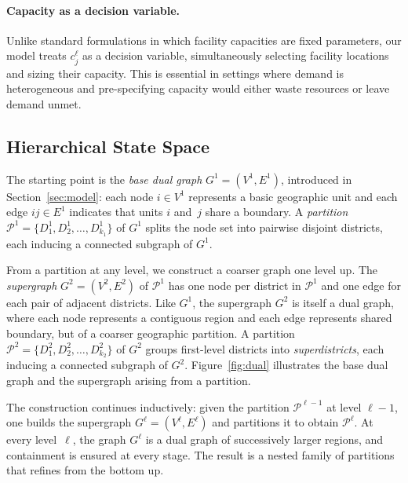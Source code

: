 \documentclass[11pt]{article}
\theoremstyle{definition}
\begin{document}
\paragraph{Capacity as a decision variable.}
Unlike standard formulations in which facility capacities are fixed parameters,
our model treats $c^{\ell}_j$ as a decision variable, simultaneously selecting
facility locations and sizing their capacity.  This is essential in settings
where demand is heterogeneous and pre-specifying capacity would either waste
resources or leave demand unmet.

\subsection{Hierarchical State Space}
\label{sec:statespace}

The starting point is the \emph{base dual graph}
$G^1 = (V^1, E^1)$, introduced in Section~\ref{sec:model}: each node
$i \in V^1$ represents a basic geographic unit and each edge $ij \in E^1$
indicates that units $i$ and~$j$ share a boundary.  A \emph{partition}
$\mathcal{P}^1 = \{D_1^1, D_2^1, \ldots, D_{k_1}^1\}$ of $G^1$ splits
the node set into pairwise disjoint districts, each inducing a connected
subgraph of $G^1$.

From a partition at any level, we construct a coarser graph one level up.
The \emph{supergraph} $G^2 = (V^2, E^2)$ of $\mathcal{P}^1$ has one node
per district in $\mathcal{P}^1$ and one edge for each pair of adjacent
districts.  Like $G^1$, the supergraph $G^2$ is itself a dual graph, where
each node represents a contiguous region and each edge represents shared
boundary, but of a coarser geographic partition.  A partition
$\mathcal{P}^2 = \{D_1^2, D_2^2, \ldots, D_{k_2}^2\}$ of $G^2$ groups
first-level districts into \emph{superdistricts}, each inducing a connected
subgraph of $G^2$.  Figure~\ref{fig:dual} illustrates the base dual graph
and the supergraph arising from a partition.

The construction continues inductively: given the partition
$\mathcal{P}^{\ell-1}$ at level $\ell - 1$, one builds the supergraph
$G^\ell = (V^\ell, E^\ell)$ and partitions it to obtain
$\mathcal{P}^\ell$.  At every level~$\ell$, the graph $G^\ell$ is a dual
graph of successively larger regions, and containment is ensured at every
stage.  The result is a nested family of partitions that refines from the
bottom up.
\end{document}
